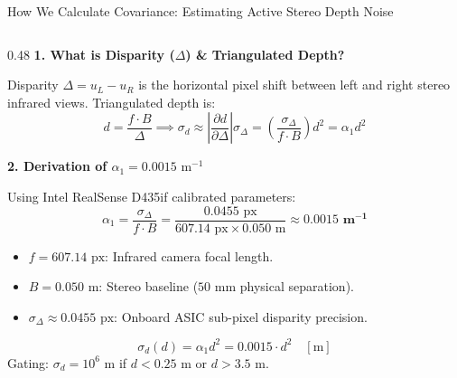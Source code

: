 \documentclass[aspectratio=169, 10pt]{beamer}
\begin{document}
\begin{frame}{How We Calculate Covariance: Estimating Active Stereo Depth Noise}
  \begin{columns}[T]
    \begin{column}{0.48\textwidth}
      {\small \textbf{\textcolor{NavyBlue}{1. What is Disparity ($\Delta$) \& Triangulated Depth?}}}
      \vspace{0.06cm}

      \scriptsize
      Disparity $\Delta = u_L - u_R$ is the horizontal pixel shift between left and right stereo infrared views. Triangulated depth is:
      \begin{equation}
        d = \frac{f \cdot B}{\Delta} \implies \sigma_d \approx \left|\frac{\partial d}{\partial \Delta}\right| \sigma_\Delta = \left(\frac{\sigma_\Delta}{f \cdot B}\right) d^2 = \alpha_1 d^2
      \end{equation}

      \vspace{0.08cm}
      {\small \textbf{\textcolor{NavyBlue}{2. Derivation of $\alpha_1 = 0.0015\text{ m}^{-1}$}}}
      \vspace{0.06cm}

      \scriptsize
      Using Intel RealSense D435if calibrated parameters:
      \begin{equation}
        \alpha_1 = \frac{\sigma_\Delta}{f \cdot B} = \frac{0.0455\text{ px}}{607.14\text{ px} \times 0.050\text{ m}} \approx \mathbf{0.0015\text{ m}^{-1}}
      \end{equation}
      \begin{itemize}
        \setlength{\itemsep}{1.5pt}
        \item $f = 607.14\text{ px}$: Infrared camera focal length.
        \item $B = 0.050\text{ m}$: Stereo baseline ($50\text{ mm}$ physical separation).
        \item $\sigma_\Delta \approx 0.0455\text{ px}$: Onboard ASIC sub-pixel disparity precision.
      \end{itemize}
      \vspace{0.05cm}
      \begin{equation}
        \boxed{\sigma_d(d) = \alpha_1 d^2 = 0.0015 \cdot d^2 \quad [\text{m}]}
      \end{equation}
      \scriptsize
      Gating: $\sigma_d = 10^6\text{ m}$ if $d < 0.25\text{ m}$ or $d > 3.5\text{ m}$.
    \end{column}


\end{columns}
\end{frame}
\end{document}
